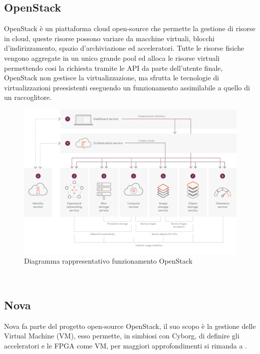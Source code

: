 \subsection{OpenStack}
OpenStack è un piattaforma cloud open-source\cite{OpenStack2} che permette la gestione di risorse in cloud, queste risorse possono variare da macchine virtuali, blocchi d'indirizzamento, spazio d'archiviazione ed acceleratori. Tutte le risorse fisiche vengono aggregate in un unico grande pool ed alloca le risorse virtuali permettendo cosi la richiesta tramite le API da parte dell'utente finale, OpenStack non gestisce la virtualizzazione, ma sfrutta le tecnologie di virtualizzazioni preesistenti eseguendo un funzionamento assimilabile a quello di un raccoglitore.
\begin{figure}[h]
\centering
\includegraphics[width=1\textwidth]{images/Openstack.jpg}
\caption{Diagramma rappresentativo funzionamento OpenStack\cite{OpenStack2}}
\end{figure}\\
\subsection{Nova}
Nova fa parte del progetto open-source OpenStack, il suo scopo è la gestione delle Virtual Machine (VM), esso permette, in simbiosi con Cyborg, di definire gli acceleratori e le FPGA come VM, per maggiori approfondimenti si rimanda a \cite{Nova}.
